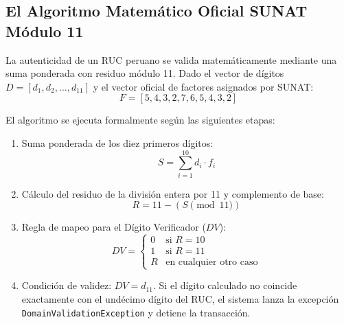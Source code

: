 \documentclass[11pt,a4paper]{article}
\begin{document}
\subsection{El Algoritmo Matemático Oficial SUNAT Módulo 11}
La autenticidad de un RUC peruano se valida matemáticamente mediante una suma ponderada con residuo módulo 11. Dado el vector de dígitos $D = [d_1, d_2, \dots, d_{11}]$ y el vector oficial de factores asignados por SUNAT:
\begin{equation}
    F = [5, 4, 3, 2, 7, 6, 5, 4, 3, 2]
\end{equation}

El algoritmo se ejecuta formalmente según las siguientes etapas:
\begin{enumerate}[noitemsep]
    \item Suma ponderada de los diez primeros dígitos:
    \begin{equation}
        S = \sum_{i=1}^{10} d_i \cdot f_i
    \end{equation}
    \item Cálculo del residuo de la división entera por 11 y complemento de base:
    \begin{equation}
        R = 11 - (S \pmod{11})
    \end{equation}
    \item Regla de mapeo para el Dígito Verificador ($DV$):
    \begin{equation}
        DV = \begin{cases} 
            0 & \text{si } R = 10 \\ 
            1 & \text{si } R = 11 \\ 
            R & \text{en cualquier otro caso} 
        \end{cases}
    \end{equation}
    \item Condición de validez: $DV = d_{11}$. Si el dígito calculado no coincide exactamente con el undécimo dígito del RUC, el sistema lanza la excepción \texttt{DomainValidationException} y detiene la transacción.
\end{enumerate}
\end{document}
